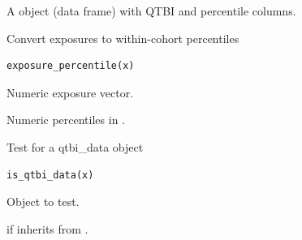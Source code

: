 \documentclass[a4paper]{book}
\begin{document}
%
\begin{Value}
A  object (data frame) with QTBI and percentile columns.
\end{Value}
%
\begin{Examples}
\end{Examples}
%
\begin{Description}
Convert exposures to within-cohort percentiles
\end{Description}
%
\begin{Usage}
\begin{verbatim}
exposure_percentile(x)
\end{verbatim}
\end{Usage}
%
\begin{Arguments}
\begin{ldescription}
\item[\code{x}] Numeric exposure vector.
\end{ldescription}
\end{Arguments}
%
\begin{Value}
Numeric percentiles in \AsIs{\texttt{(0, 1]}}.
\end{Value}
%
\begin{Description}
Test for a qtbi\_data object
\end{Description}
%
\begin{Usage}
\begin{verbatim}
is_qtbi_data(x)
\end{verbatim}
\end{Usage}
%
\begin{Arguments}
\begin{ldescription}
\item[\code{x}] Object to test.
\end{ldescription}
\end{Arguments}
%
\begin{Value}
 if  inherits from .
\end{Value}
\end{document}
